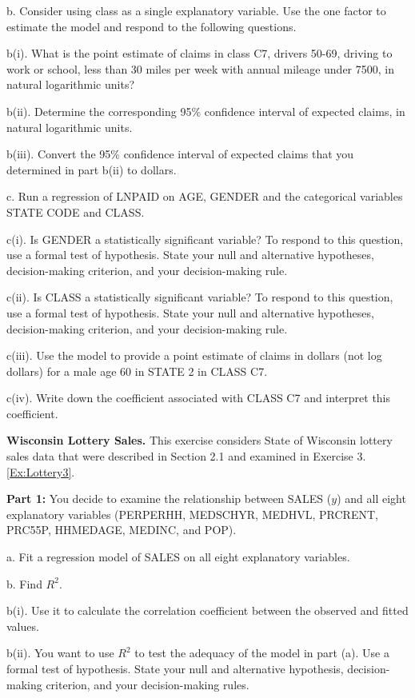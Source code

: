 \begin{exercises}
b. Consider using class as a single explanatory variable. Use the
one factor to estimate the model and respond to the following
questions.

b(i). What is the point estimate of claims in class C7, drivers
50-69, driving to work or school, less than 30 miles per week with
annual mileage under 7500, in natural logarithmic units?

b(ii). Determine the corresponding 95\% confidence interval of
expected claims, in natural logarithmic units.

b(iii). Convert the 95\% confidence interval of expected claims that
you determined in part b(ii) to dollars.

c. Run a regression of LNPAID on AGE, GENDER and the categorical
variables STATE CODE and CLASS.

c(i). Is GENDER a statistically significant variable? To respond to
this question, use a formal test of hypothesis. State your null and
alternative hypotheses, decision-making criterion, and your
decision-making rule.

c(ii). Is CLASS a statistically significant variable? To respond to
this question, use a formal test of hypothesis. State your null and
alternative hypotheses, decision-making criterion, and your
decision-making rule.

c(iii). Use the model to provide a point estimate of claims in
dollars (not log dollars) for a male age 60 in STATE 2 in CLASS C7.

c(iv). Write down the coefficient associated with CLASS C7 and
interpret this coefficient.


\item \textbf{Wisconsin Lottery Sales.}\label{Ex:Lottery4}
This exercise considers State of Wisconsin lottery sales data that
were described in Section 2.1 and examined in Exercise
3.\ref{Ex:Lottery3}.

\textbf{Part 1:} You decide to examine the relationship between
SALES ($y$) and all eight explanatory variables (PERPERHH, MEDSCHYR,
MEDHVL, PRCRENT, PRC55P, HHMEDAGE, MEDINC, and POP).

a. Fit a regression model of SALES on all eight explanatory
variables.

b. Find $R^2$.

b(i). Use it to calculate the correlation coefficient between the
observed and fitted values.

b(ii). You want to use $R^2$ to test the adequacy of the model in
part (a). Use a formal test of hypothesis. State your null and
alternative hypothesis, decision-making criterion, and your
decision-making rules.


\end{exercises}
